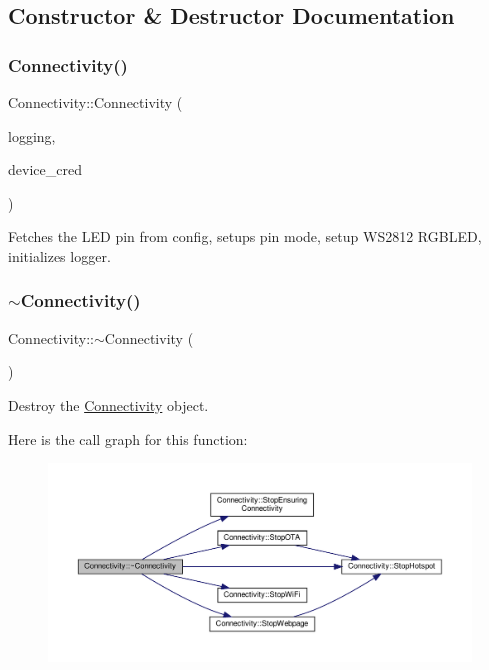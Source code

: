 \subsection{Constructor \& Destructor Documentation}
\mbox{\label{classConnectivity_ad5b40b0c07375786dd882379e93df2fc}} 
\subsubsection{\texorpdfstring{Connectivity()}{Connectivity()}}
{\footnotesize\ttfamily Connectivity\+::\+Connectivity (\begin{DoxyParamCaption}\item[{std\+::shared\+\_\+ptr$<$ \hyperlink{classLogging}{Logging} $>$ \&}]{logging,  }\item[{\hyperlink{structCONFIG__SET_1_1DEVICE__CRED}{C\+O\+N\+F\+I\+G\+\_\+\+S\+E\+T\+::\+D\+E\+V\+I\+C\+E\+\_\+\+C\+R\+ED} $\ast$}]{device\+\_\+cred }\end{DoxyParamCaption})}



Fetches the L\+ED pin from config, setups pin mode, setup W\+S2812 R\+G\+B\+L\+ED, initializes logger. 

\mbox{\label{classConnectivity_a0029e5f1650cb0152256d89595941e6a}} 
\subsubsection{\texorpdfstring{$\sim$\+Connectivity()}{~Connectivity()}}
{\footnotesize\ttfamily Connectivity\+::$\sim$\+Connectivity (\begin{DoxyParamCaption}{ }\end{DoxyParamCaption})}



Destroy the \hyperlink{classConnectivity}{Connectivity} object. 

Here is the call graph for this function\+:
\nopagebreak
\begin{figure}[H]
\begin{center}
\leavevmode
\includegraphics[width=350pt]{classConnectivity_a0029e5f1650cb0152256d89595941e6a_cgraph}
\end{center}
\end{figure}



